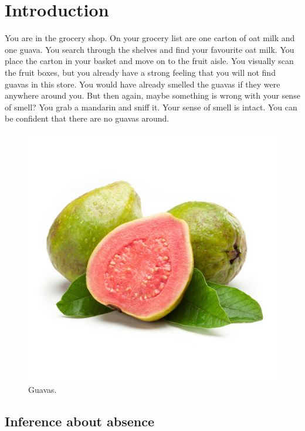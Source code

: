 \documentclass[12pt,twoside]{reedthesis}
\begin{document}
\hypertarget{introduction}{%
\chapter*{Introduction}\label{introduction}}

You are in the grocery shop. On your grocery list are one carton of oat milk and one guava. You search through the shelves and find your favourite oat milk. You place the carton in your basket and move on to the fruit aisle. You visually scan the fruit boxes, but you already have a strong feeling that you will not find guavas in this store. You would have already smelled the guavas if they were anywhere around you. But then again, maybe something is wrong with your sense of smell? You grab a mandarin and sniff it. Your sense of smell is intact. You can be confident that there are no guavas around.
\begin{figure}
\includegraphics[width=\textwidth]{figure/intro/guava} \caption[Guavas]{Guavas.}\label{fig:intro-guava}
\end{figure}
\hypertarget{inference-about-absence}{%
\section{Inference about absence}\label{inference-about-absence}}
\end{document}
